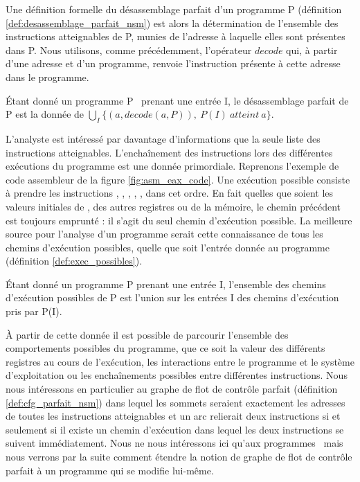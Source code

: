 Une définition formelle du désassemblage parfait d'un programme P (définition \ref{def:desassemblage_parfait_nsm}) est alors la détermination de l'ensemble des instructions atteignables de P, munies de l'adresse à laquelle elles sont présentes dans P.
Nous utilisons, comme précédemment, l'opérateur $decode$ qui, à partir d'une adresse et d'un programme, renvoie l'instruction présente à cette adresse dans le programme.

\begin{defi}
 Étant donné un programme P \nsm\ prenant une entrée I, le désassemblage parfait de P est la donnée de $\bigcup_{I} \{(a, decode(a, P)),\ P(I)\ atteint\ a\}$.
\label{def:desassemblage_parfait_nsm}
\end{defi}

L'analyste est intéressé par davantage d'informations que la seule liste des instructions atteignables.
L'enchaînement des instructions lors des différentes exécutions du programme est une donnée primordiale.
Reprenons l'exemple de code assembleur de la figure \ref{fig:asm_eax_code}. Une exécution possible consiste à prendre les instructions , , , , ,  dans cet ordre. En fait quelles que soient les valeurs initiales de \eax, des autres registres ou de la mémoire, le chemin précédent est toujours emprunté : il s'agit du seul chemin d'exécution possible.
La meilleure source pour l'analyse d'un programme serait cette connaissance de tous les chemins d'exécution possibles, quelle que soit l'entrée donnée au programme (définition \ref{def:exec_possibles}).

\begin{defi}
 Étant donné un programme P prenant une entrée I, l'ensemble des chemins d'exécution possibles de P est l'union sur les entrées I des chemins d'exécution pris par P(I).
\label{def:exec_possibles}
\end{defi}

À partir de cette donnée il est possible de parcourir l'ensemble des comportements possibles du programme, que ce soit la valeur des différents registres au cours de l'exécution, les interactions entre le programme et le système d'exploitation ou les enchaînements possibles entre différentes instructions.
Nous nous intéressons en particulier au graphe de flot de contrôle parfait (définition \ref{def:cfg_parfait_nsm}) dans lequel les sommets seraient exactement les adresses de toutes les instructions atteignables et un arc relierait deux instructions si et seulement si il existe un chemin d'exécution dans lequel les deux instructions se suivent immédiatement.
Nous ne nous intéressons ici qu'aux programmes \nsms\ mais nous verrons par la suite comment étendre la notion de graphe de flot de contrôle parfait à un programme qui se modifie lui-même.

